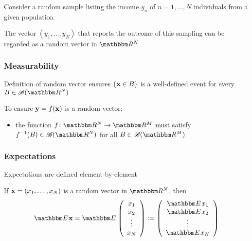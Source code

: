 \begin{frame}

    \vspace{2em}
    \Eg
    Consider a random sample listing the income $y_n$ of $n=1,\ldots,N$
    individuals from a given population
    
    The vector $(y_1, \ldots, y_N)$ that
    reports the outcome of this sampling can be regarded as a random vector in
    $\RR^N$
    
\end{frame}

\begin{frame}\frametitle{Measurability} 

     \vspace{2em}
    Definition of random vector ensures $\{{\mathbf x} \in B\}$ is a well-defined event
    for every $B \in \bB(\RR^N)$
    
    \vspace{1em}
    To ensure ${\mathbf y} = f({\mathbf x})$ is a random vector:
    
    \begin{itemize}
        \item the function $f \colon \RR^N \to \RR^M$ must 
        satisfy $f^{-1}(B) \in \bB(\RR^N)$ for all
        $B \in \bB(\RR^M)$
    \end{itemize}

\end{frame}

\begin{frame}\frametitle{Expectations}

    \vspace{2em}
    Expectations are defined element-by-element
    
    \vspace{1em}
    If ${\mathbf x} = (x_1, \ldots, x_N)$ is a random vector 
    in $\RR^N$, then 
    \begin{equation*}
        \EE \boldx
        = 
        \EE
        \left(
        \begin{array}{c}
            x_1 \\
            x_2 \\
            \vdots \\
            x_N
        \end{array}
        \right)
        :=
        \left(
        \begin{array}{c}
            \EE x_1 \\
            \EE x_2 \\
            \vdots \\
            \EE x_N
        \end{array}
        \right)
    \end{equation*}

\end{frame}

